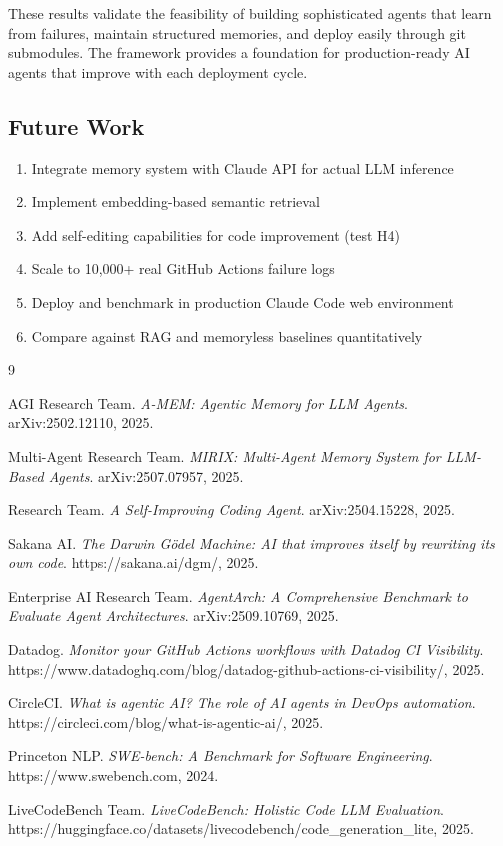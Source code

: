 \documentclass{article}
\begin{document}
These results validate the feasibility of building sophisticated agents that learn from failures, maintain structured memories, and deploy easily through git submodules. The framework provides a foundation for production-ready AI agents that improve with each deployment cycle.

\subsection{Future Work}

\begin{enumerate}
    \item Integrate memory system with Claude API for actual LLM inference
    \item Implement embedding-based semantic retrieval
    \item Add self-editing capabilities for code improvement (test H4)
    \item Scale to 10,000+ real GitHub Actions failure logs
    \item Deploy and benchmark in production Claude Code web environment
    \item Compare against RAG and memoryless baselines quantitatively
\end{enumerate}

\begin{thebibliography}{9}

AGI Research Team.
\textit{A-MEM: Agentic Memory for LLM Agents}.
arXiv:2502.12110, 2025.

Multi-Agent Research Team.
\textit{MIRIX: Multi-Agent Memory System for LLM-Based Agents}.
arXiv:2507.07957, 2025.

Research Team.
\textit{A Self-Improving Coding Agent}.
arXiv:2504.15228, 2025.

Sakana AI.
\textit{The Darwin Gödel Machine: AI that improves itself by rewriting its own code}.
https://sakana.ai/dgm/, 2025.

Enterprise AI Research Team.
\textit{AgentArch: A Comprehensive Benchmark to Evaluate Agent Architectures}.
arXiv:2509.10769, 2025.

Datadog.
\textit{Monitor your GitHub Actions workflows with Datadog CI Visibility}.
https://www.datadoghq.com/blog/datadog-github-actions-ci-visibility/, 2025.

CircleCI.
\textit{What is agentic AI? The role of AI agents in DevOps automation}.
https://circleci.com/blog/what-is-agentic-ai/, 2025.

Princeton NLP.
\textit{SWE-bench: A Benchmark for Software Engineering}.
https://www.swebench.com, 2024.

LiveCodeBench Team.
\textit{LiveCodeBench: Holistic Code LLM Evaluation}.
https://huggingface.co/datasets/livecodebench/code\_generation\_lite, 2025.

\end{thebibliography}
\end{document}
